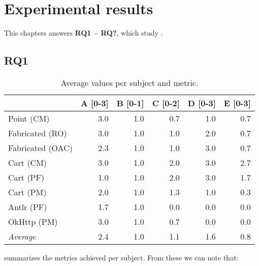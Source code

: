     \chapter{Experimental results}\label{chap:results}

This chapters answers \textbf{RQ1 – RQ?}, which study .

\section{RQ1}\label{sec:results:rq1}

\begin{table}[t]
\centering
\begin{tabular}{@{\extracolsep{\fill}} lrrrrr} \toprule
                 & A [0-3] & B [0-1] & C [0-2] & D [0-3] & E [0-3] \\
\midrule
Point (CM)       & 3.0 & 1.0 & 0.7 & 1.0 & 0.7 \\
Fabricated (RO)  & 3.0 & 1.0 & 1.0 & 2.0 & 0.7 \\
Fabricated (OAC) & 2.3 & 1.0 & 1.0 & 3.0 & 0.7 \\
Cart (CM)        & 3.0 & 1.0 & 2.0 & 3.0 & 2.7 \\
Cart (PF)        & 1.0 & 1.0 & 2.0 & 3.0 & 1.7 \\
Cart (PM)        & 2.0 & 1.0 & 1.3 & 1.0 & 0.3 \\
Antlr (PF)       & 1.7 & 1.0 & 0.0 & 0.0 & 0.0 \\
OkHttp (PM)      & 3.0 & 1.0 & 0.7 & 0.0 & 0.0 \\
\midrule
\textit{Average}  & 2.4 & 1.0 & 1.1 & 1.6 & 0.8 \\
\bottomrule
\end{tabular}
\caption{Average values per subject and metric.\label{tab:results:rq1}}
\end{table}

 summarizes the metrics achieved per subject. From these we can note that:

